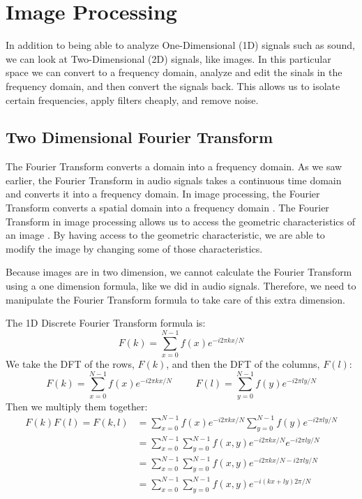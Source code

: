 \documentclass [../article.tex]{subfiles}
\begin{document}
  \section{Image Processing}

  In addition to being able to analyze One-Dimensional (1D) signals such as sound, we can look at Two-Dimensional (2D) signals, like images. In this particular space we can convert to a frequency domain, analyze and edit the sinals in the frequency domain, and then convert the signals back. This allows us to isolate certain frequencies, apply filters cheaply, and remove noise.

  \subsection{Two Dimensional Fourier Transform}
  The Fourier Transform converts a domain into a frequency domain.
  As we saw earlier, the Fourier Transform in audio signals takes
  a continuous time domain and converts it into a frequency domain.
  In image processing, the Fourier Transform converts a spatial
  domain into a frequency domain \cite{smith_1997}. The Fourier Transform in image processing allows us to access the geometric
  characteristics of an image \cite{fisher_perkins_walker_wolfart_2003}. By having access to the geometric characteristic, we are able to modify the image by changing some of those characteristics.

  Because images are in two dimension, we cannot calculate the
  Fourier Transform using a one dimension formula, like we did in
  audio signals.  Therefore, we need to manipulate the Fourier
  Transform formula to take care of this extra dimension.

  The 1D Discrete Fourier Transform formula is:
  \[ F(k) = \sum_{x=0}^{N-1}f(x)e^{-i2\pi kx/N} \]
  We take the DFT of the rows, $F(k)$, and then the DFT of the
  columns, $F(l)$:
  \[F(k) = \sum_{x=0}^{N-1}f(x)e^{-i2\pi kx/N}
    \phantom{space}
    F(l) = \sum_{y=0}^{N-1}f(y)e^{-i2\pi ly/N}\]
  Then we multiply them together:
  \begin{align*}
    F(k)F(l) = F(k,l) &=
    \sum_{x=0}^{N-1}f(x)e^{-i2\pi kx/N}
    \sum_{y=0}^{N-1}f(y)e^{-i2\pi ly/N}\\
    {} &= \sum_{x=0}^{N-1}\sum_{y=0}^{N-1}f(x,y)
    e^{-i2\pi kx/N}e^{-i2\pi ly/N}\\
    {} &= \sum_{x=0}^{N-1}\sum_{y=0}^{N-1}f(x,y)
    e^{-i2\pi kx/N - i2\pi ly/N}\\
    {} &= \sum_{x=0}^{N-1}\sum_{y=0}^{N-1}f(x,y)
    e^{-i(kx+ly)2\pi/N }
  \end{align*}
\end{document}
